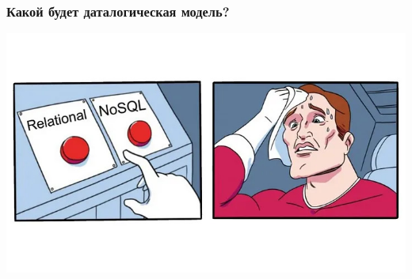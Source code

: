 \documentclass[aspectratio=169]{beamer}
\begin{document}
\begin{frame}[fragile]
  \transwipe[direction=90]
  \frametitle{Какой будет даталогическая модель?}
  
  \begin{center}
    \includegraphics[height=.85\textheight]{pictures/Mem2.jpg}
  \end{center}
\end{frame}
\end{document}
